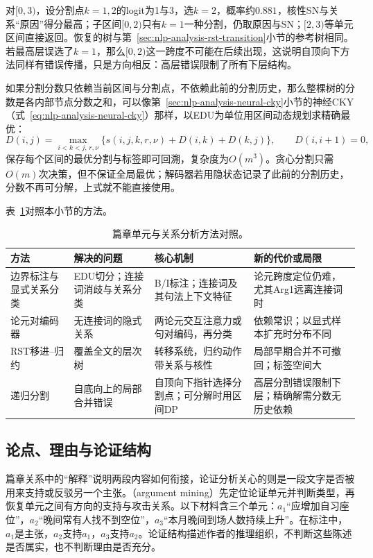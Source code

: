 对$[0,3)$，设分割点$k=1,2$的logit为1与3，选$k=2$，概率约$0.881$，核性SN与关系“原因”得分最高；子区间$[0,2)$只有$k=1$一种分割，仍取原因与SN；$[2,3)$等单元区间直接返回。恢复的树与第~\ref{sec:nlp-analysis-rst-transition}小节的参考树相同。若最高层误选了$k=1$，那么$[0,2)$这一跨度不可能在后续出现，这说明自顶向下方法同样有错误传播，只是方向相反：高层错误限制了所有下层结构。

如果分割分数只依赖当前区间与分割点，不依赖此前的分割历史，那么整棵树的分数是各内部节点分数之和，可以像第~\ref{sec:nlp-analysis-neural-cky}小节的神经CKY（式~\eqref{eq:nlp-analysis-neural-cky}）那样，以EDU为单位用区间动态规划求精确最优：
\[
  D(i,j)=\max_{i<k<j,\,r,\nu}\bigl\{s(i,j,k,r,\nu)+D(i,k)+D(k,j)\bigr\},\qquad D(i,i+1)=0,
\]
保存每个区间的最优分割与标签即可回溯，复杂度为$O(m^3)$。贪心分割只需$O(m)$次决策，但不保证全局最优；解码器若用隐状态记录了此前的分割历史，分数不再可分解，上式就不能直接使用。

表~\ref{tab:nlp-analysis-discourse-methods}对照本小节的方法。

\begin{table}[htbp]
  \centering
  \small
  \begin{tabularx}{\linewidth}{@{}l XXX@{}}
    \toprule
    方法 & 解决的问题 & 核心机制 & 新的代价或局限\\
    \midrule
    边界标注与显式关系分类 & EDU切分；连接词消歧与关系分类 & B/I标注；连接词及其句法上下文特征 & 论元跨度定位仍难，尤其Arg1远离连接词时\\
    论元对编码器 & 无连接词的隐式关系 & 两论元交互注意力或句对编码，再分类 & 依赖常识；以显式样本扩充时分布不同\\
    RST移进--归约 & 覆盖全文的层次树 & 转移系统，归约动作带关系与核性 & 局部早期合并不可撤回；标签空间大\\
    递归分割 & 自底向上的局部合并错误 & 自顶向下指针选择分割点；可分解时用区间DP & 高层分割错误限制下层；精确解需分数无历史依赖\\
    \bottomrule
  \end{tabularx}
  \caption{篇章单元与关系分析方法对照。}
  \label{tab:nlp-analysis-discourse-methods}
\end{table}

\subsection{论点、理由与论证结构}
\label{sec:nlp-analysis-argumentation}

篇章关系中的“解释”说明两段内容如何衔接，论证分析关心的则是一段文字是否被用来支持或反驳另一个主张。（argument mining）先定位论证单元并判断类型，再恢复单元之间有方向的支持与攻击关系。以下材料含三个单元：$a_1$“应增加自习座位”，$a_2$“晚间常有人找不到空位”，$a_3$“本月晚间到场人数持续上升”。在标注中，$a_1$是主张，$a_2$支持$a_1$，$a_3$支持$a_2$。论证结构描述作者的推理组织，不判断这些陈述是否属实，也不判断理由是否充分。

